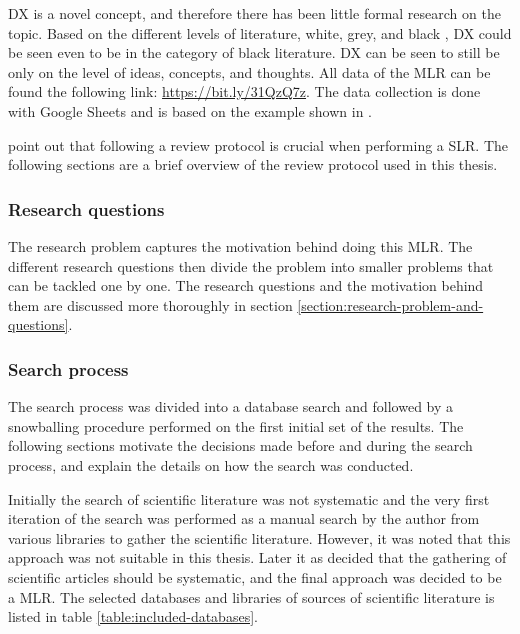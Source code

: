 \documentclass[english, 12pt, a4paper, sci, utf8, a-1b, online]{aaltothesis}
\newcounter{subsubsubsection}[subsubsection]
\begin{document}
DX is a novel concept, and therefore there has been little formal research on the topic. Based on the different levels of literature, white, grey, and black \parencite{guidelines-for-MLR}, DX could be seen even to be in the category of black literature. DX can be seen to still be only on the level of ideas, concepts, and thoughts. All data of the MLR can be found the following link: \href{\mlrdxlink}{https://bit.ly/31QzQ7z}. The data collection is done with Google Sheets and is based on the example shown in \textcite{guidelines-for-MLR}.

\textcite{guidelines-for-SLR-in-SE} point out that following a review protocol is crucial when performing a SLR. The following sections are a brief overview of the review protocol used in this thesis. 

\subsubsection{Research questions}

The research problem captures the motivation behind doing this MLR. The different research questions then divide the problem into smaller problems that can be tackled one by one. The research questions and the motivation behind them are discussed more thoroughly in section \ref{section:research-problem-and-questions}.

\subsubsection{Search process}

The search process was divided into a database search and followed by a snowballing procedure performed on the first initial set of the results. The following sections motivate the decisions made before and during the search process, and explain the details on how the search was conducted.


Initially the search of scientific literature was not systematic and the very first iteration of the search was performed as a manual search by the author from various libraries to gather the scientific literature. However, it was noted that this approach was not suitable in this thesis. Later it as decided that the gathering of scientific articles should be systematic, and the final approach was decided to be a MLR. The selected databases and libraries of sources of scientific literature is listed in table \ref{table:included-databases}.
\end{document}
